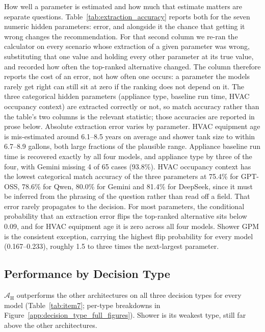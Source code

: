 \documentclass[final,3p,times]{elsarticle}
\begin{document}
How well a parameter is estimated and how much that estimate matters are separate questions. Table~\ref{tab:extraction_accuracy} reports both for the seven numeric hidden parameters: error, and alongside it the chance that getting it wrong changes the recommendation. For that second column we re-ran the calculator on every scenario whose extraction of a given parameter was wrong, substituting that one value and holding every other parameter at its true value, and recorded how often the top-ranked alternative changed. The column therefore reports the cost of an error, not how often one occurs: a parameter the models rarely get right can still sit at zero if the ranking does not depend on it. The three categorical hidden parameters (appliance type, baseline run time, HVAC occupancy context) are extracted correctly or not, so match accuracy rather than the table's two columns is the relevant statistic; those accuracies are reported in prose below.
Absolute extraction error varies by parameter. HVAC equipment age is mis-estimated around 6.1--8.5 years on average and shower tank size to within 6.7--8.9 gallons, both large fractions of the plausible range.  Appliance baseline run time is recovered exactly by all four models, and appliance type by three of the four, with Gemini missing 4 of 65 cases (93.8\%). HVAC occupancy context has the lowest categorical match accuracy of the three parameters at 75.4\% for GPT-OSS, 78.6\% for Qwen, 80.0\% for Gemini and 81.4\% for DeepSeek, since it must be inferred from the phrasing of the question rather than read off a field.
That error rarely propagates to the decision. For most parameters, the conditional probability that an extraction error flips the top-ranked alternative sits below 0.09, and for HVAC equipment age it is zero across all four models. Shower GPM is the consistent exception, carrying the highest flip probability for every model (0.167--0.233), roughly 1.5 to three times the next-largest parameter.


\FloatBarrier
\subsection{Performance by Decision Type}
\label{sec:res-bytype}
$\mathcal{A}_{\text{H}}$ outperforms the other architectures on all three decision types for every model (Table~\ref{tab:item7}; per-type breakdowns in Figure~\ref{app:decision_type_full_figures}). Shower is its weakest type, still far above the other architectures.
\end{document}
